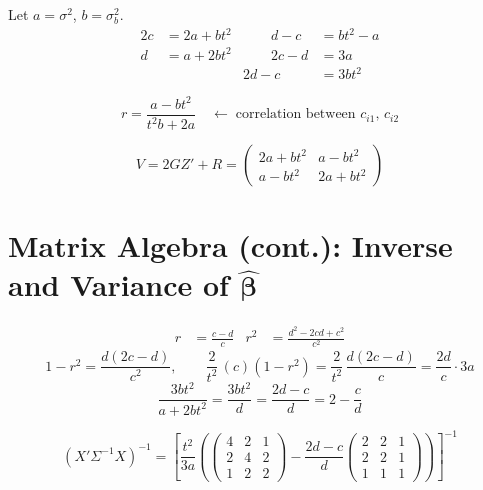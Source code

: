 \documentclass[11pt]{article}
\begin{document}
Let $a = \sigma^2$, \; $b = \sigma_b^2$.
\begin{alignat*}{2}
  c &= 2a + bt^2 &\qquad
  d - c &= bt^2 - a \\
  d &= a + 2bt^2 &\qquad
  2c - d &= 3a \\
  && 2d - c &= 3bt^2
\end{alignat*}

\begin{equation}
  \boxed{
  r = \frac{a - bt^2}{t^2 b + 2a}
  \quad\longleftarrow\;
  \text{correlation between } c_{i1},\, c_{i2}
  }
\end{equation}

\begin{equation}
  V = 2GZ' + R
  = \begin{pmatrix}
      2a + bt^2 & a - bt^2 \\
      a - bt^2 & 2a + bt^2
    \end{pmatrix}
\end{equation}


\newpage
\section{Matrix Algebra (cont.): Inverse and
  Variance of $\hat{\bm{\beta}}$}

\begin{align}
  r &= \frac{c - d}{c} &
  r^2 &= \frac{d^2 - 2cd + c^2}{c^2}
\end{align}
\[
  1 - r^2 = \frac{d(2c - d)}{c^2}, \qquad
  \frac{2}{t^2}\,(c)(1-r^2)
  = \frac{2}{t^2}\,\frac{d(2c-d)}{c}
  = \frac{2d}{c}\cdot 3a
\]
\[
  \frac{3bt^2}{a + 2bt^2}
  = \frac{3bt^2}{d}
  = \frac{2d - c}{d}
  = 2 - \frac{c}{d}
\]

\begin{equation}
  (X'\Sigma^{-1}X)^{-1}
  = \left[
    \frac{t^2}{3a}\!\left(
      \begin{pmatrix}
        4 & 2 & 1 \\ 2 & 4 & 2 \\ 1 & 2 & 2
      \end{pmatrix}
      - \frac{2d-c}{d}
      \begin{pmatrix}
        2 & 2 & 1 \\ 2 & 2 & 1 \\ 1 & 1 & 1
      \end{pmatrix}
    \right)
  \right]^{-1}
\end{equation}
\end{document}
